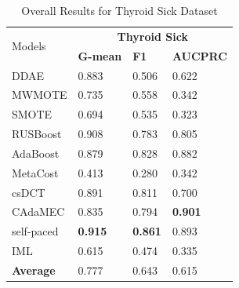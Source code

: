 \begin{table}[h]
    \centering
    \begin{tabular}{|p{}<{\centering}|p{}<{\centering}|p{}<{\centering}|p{}<{\centering}|}
    \hline
    \multirow{2}{*}{Models} & \multicolumn{3}{c|}{\textbf{Thyroid Sick}}    \\ \cline{2-4} 
                             & \textbf{G-mean} & \textbf{F1} & \textbf{AUCPRC} \\ \hline
    DDAE                     & 0.883	&0.506	&0.622               \\ \hline
    MWMOTE                   &0.735	&0.558	&0.342                \\ \hline
    SMOTE                    & 0.694	&0.535	&0.323                \\ \hline
    RUSBoost                 & 0.908	&0.783	&0.805                \\ \hline
    AdaBoost                 & 0.879	&0.828	&0.882                \\ \hline
    MetaCost                 & 0.413	&0.280	&0.342               \\ \hline
    csDCT                    & 0.891	&0.811	&0.700                \\ \hline
    CAdaMEC                  & 0.835	&0.794	&\textbf{0.901}                \\ \hline
    self-paced               & \textbf{0.915}	&\textbf{0.861}	&0.893                 \\ \hline
    IML                      & 0.615	&0.474	&0.335               \\ \hline\hline
    \textbf{Average}         & 0.777	&0.643	&0.615                 \\ \hline
    \end{tabular}
    \caption{Overall Results for Thyroid Sick Dataset}
    \label{tab9}
\end{table}
